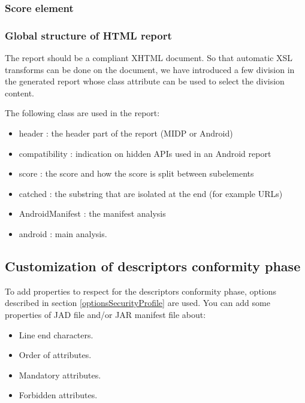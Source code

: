 \subsubsection{Score element}


\subsubsection{Global structure of HTML report}
The report should be a compliant XHTML document. So that automatic XSL
transforms can be done on the document, we have introduced a few division in the
generated report whose class attribute can be used to select the division
content.

The following class are used in the report:
\begin{itemize}
  \item header : the header part of the report (MIDP or Android)
  \item compatibility : indication on hidden APIs used in an Android report
  \item score : the score and how the score is split between subelements
  \item catched : the substring that are isolated at the end (for example URLs)
  \item AndroidManifest : the manifest analysis
  \item android : main analysis.
\end{itemize}

\subsection{Customization of descriptors conformity phase}
\label{CustoConform}

To add properties to respect for the descriptors conformity phase, options
described in section \ref{optionsSecurityProfile} are used. You can add
some properties of JAD file and/or JAR manifest file about:
\begin{itemize}
  \item Line end characters.
  \item Order of attributes.
  \item Mandatory attributes.
  \item Forbidden attributes. 
\end{itemize}

